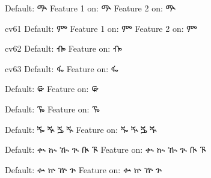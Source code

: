 \IndSS Default: ᎁ
\IndSS\OTsixtyone Feature 1 on: ᎁ
\IndSS\OTsixtytwo Feature 2 on: ᎁ

\IndSS cv61  Default: ᎃ
\IndSS\OTsixtyoneone Feature 1 on: ᎃ
\IndSS\OTsixtyonetwo Feature 2 on: ᎃ

\IndSS cv62 Default: ᎇ
\IndSS\OTsixtytwoone Feature on: ᎇ

\IndSS cv63 Default: ᎊ
\IndSS\OTsixtythree Feature on: ᎊ

\IndSS Default: ᎋ
\IndSS\OTsixtyfour Feature on: ᎋ

\IndSS Default: ᎏ
\IndSS\OTsixtyfive Feature on: ᎏ

\IndSS Default: ⶓ ⶔ ⶕ ⶖ
\IndSS\OTseventy Feature on: ⶓ ⶔ ⶕ ⶖ

\IndSS Default: ቊ ኲ ዂ ጒ ᎅ ᎍ
\IndSS\OTeighty Feature on: ቊ ኲ ዂ ጒ ᎅ ᎍ

\IndSS Default: ቍ ኵ ዅ ጕ 
\IndSS\OTeightyfive Feature on: ቍ ኵ ዅ ጕ


\bye
